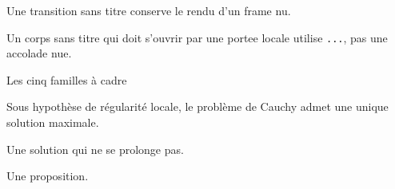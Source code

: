 %

\begin{slide}

\vfill
\begin{center}
    \large Une transition sans titre conserve le rendu d'un frame nu.
\end{center}
\vfill

\end{slide}

\begin{slide}
\begingroup\small
Un corps sans titre qui doit s'ouvrir par une portee locale utilise
\texttt{\string\begingroup...\string\endgroup}, pas une accolade nue.
\endgroup
\end{slide}

\begin{slide}{Les cinq familles à cadre}

\begin{theorem}[title={Cauchy--Lipschitz}, label=thm:cauchyslide]%
    Sous hypothèse de régularité locale, le problème de Cauchy admet une
    unique solution maximale.
\end{theorem}

\pause

\begin{definition}[title=Solution maximale, label=def:solmax]%
    Une solution qui ne se prolonge pas.
\end{definition}

\pause

\begin{proposition}[label=prop:slide-proposition]
    Une proposition.
\end{proposition}

\end{slide}


